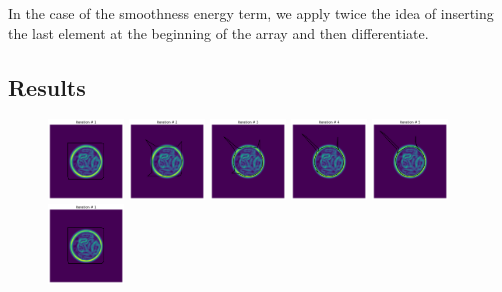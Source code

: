 \documentclass[24pt]{article}
\begin{document}
In the case of the smoothness energy term, we apply twice the idea of inserting the last element at the beginning of the array and then differentiate.

\subsection{Results}


\begin{figure}[h!]
  \centering
  \includegraphics[width=0.18\textwidth]{it_1_no_shape.png}
    \includegraphics[width=0.18\textwidth]{it_2_no_shape.png}
      \includegraphics[width=0.18\textwidth]{it_3_no_shape.png}
        \includegraphics[width=0.18\textwidth]{it_4_no_shape.png}
          \includegraphics[width=0.18\textwidth]{it_5_no_shape.png}
  \includegraphics[width=0.18\textwidth]{it_1_alph_10_bet_0.png}

\end{figure}
\end{document}

